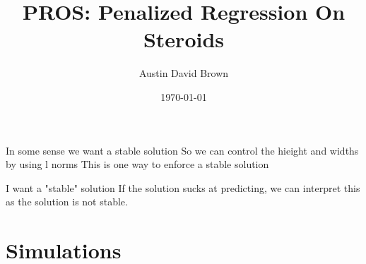 \documentclass[12pt, a4paper, reqno]{amsart}
\numberwithin{equation}{section}
\begin{document}
\title{PROS: Penalized Regression On Steroids}
\author{Austin David Brown}
\date{\today}
\maketitle

\begin{abstract}
\end{abstract}


In some sense we want a stable solution
So we can control the hieight and widths by using l norms
This is one way to enforce a stable solution

I want a "stable" solution
If the solution sucks at predicting, we can interpret this as the solution is not stable.

\section{Simulations}
\end{document}
